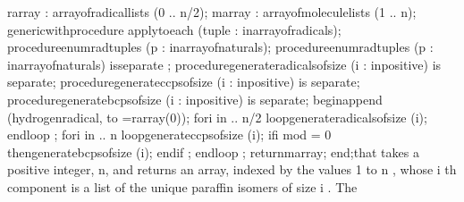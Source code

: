    r\Symuns[]array : array\Symuns[]of\Symuns[]radical\Symuns[]lists  (0 .. n/2);
   m\Symuns[]array : array\Symuns[]of\Symuns[]molecule\Symuns[]lists (1 .. n);
   \tyxtstxbf[]generic\tyxtstxendbf[]
      \tyxtstxbf[]with\tyxtstxendbf[] \tyxtstxbf[]procedure%
\tyxtstxendbf[] apply\Symuns[]to\Symuns[]each (tuple : %
\tyxtstxbf[]in\tyxtstxendbf[] array\Symuns[]of\Symuns[]radicals);
   \tyxtstxbf[]procedure\tyxtstxendbf[] enum\Symuns[]rad\Symuns[]tuples (p : %
\tyxtstxbf[]in\tyxtstxendbf[] array\Symuns[]of\Symuns[]naturals);
   \tyxtstxbf[]procedure\tyxtstxendbf[] enum\Symuns[]rad\Symuns[]tuples (p : %
\tyxtstxbf[]in\tyxtstxendbf[] array\Symuns[]of\Symuns[]naturals)  %
\tyxtstxbf[]is\tyxtstxendbf[] \tyxtstxbf[]separate%
\tyxtstxendbf[];
   \tyxtstxbf[]procedure\tyxtstxendbf[] generate\Symuns[]radicals\Symuns[]of\Symuns[]size (i : %
\tyxtstxbf[]in\tyxtstxendbf[] positive) \tyxtstxbf[]is%
\tyxtstxendbf[] \tyxtstxbf[]separate\tyxtstxendbf[];
   \tyxtstxbf[]procedure\tyxtstxendbf[] generate\Symuns[]ccps\Symuns[]of\Symuns[]size     (i : %
\tyxtstxbf[]in\tyxtstxendbf[] positive) \tyxtstxbf[]is%
\tyxtstxendbf[] \tyxtstxbf[]separate\tyxtstxendbf[];
   \tyxtstxbf[]procedure\tyxtstxendbf[] generate\Symuns[]bcps\Symuns[]of\Symuns[]size     (i : %
\tyxtstxbf[]in\tyxtstxendbf[] positive) \tyxtstxbf[]is%
\tyxtstxendbf[] \tyxtstxbf[]separate\tyxtstxendbf[];
\tyxtstxbf[]begin\tyxtstxendbf[]
   append (hydrogen\Symuns[]radical, to =\Symgt[] r\Symuns[]array(0));
   \tyxtstxbf[]for\tyxtstxendbf[] i \tyxtstxbf[]in%
 .. n/2 \tyxtstxbf[]loop\tyxtstxendbf[]
      generate\Symuns[]radicals\Symuns[]of\Symuns[]size (i);
   \tyxtstxbf[]end\tyxtstxendbf[] \tyxtstxbf[]loop%
\tyxtstxendbf[];
   \tyxtstxbf[]for\tyxtstxendbf[] i \tyxtstxbf[]in%
 .. n \tyxtstxbf[]loop\tyxtstxendbf[]
      generate\Symuns[]ccps\Symuns[]of\Symuns[]size (i);
      \tyxtstxbf[]if\tyxtstxendbf[] i \tyxtstxbf[]mod%
 = 0 \tyxtstxbf[]then\tyxtstxendbf[]
         generate\Symuns[]bcps\Symuns[]of\Symuns[]size (i);
      \tyxtstxbf[]end\tyxtstxendbf[] \tyxtstxbf[]if%
\tyxtstxendbf[];
   \tyxtstxbf[]end\tyxtstxendbf[] \tyxtstxbf[]loop%
\tyxtstxendbf[];
   \tyxtstxbf[]return\tyxtstxendbf[] m\Symuns[]array;
\tyxtstxbf[]end\tyxtstxendbf[];\Endcomp[]
\EndParbox[]
\FgEndblock[]
 that takes a positive integer, \tyxffmxmono[]n\tyxffmxendmono[],
and returns an array, indexed by the values 1 to \tyxffmxmono[]n%
\tyxffmxendmono[], whose \InlEqn[]\LmthEqn[]i
\LmthEndeqn[]\EndInlEqn[]th component is a list
of the unique paraffin isomers of size \InlEqn[]\LmthEqn[]i
\LmthEndeqn[]\EndInlEqn[]. The
